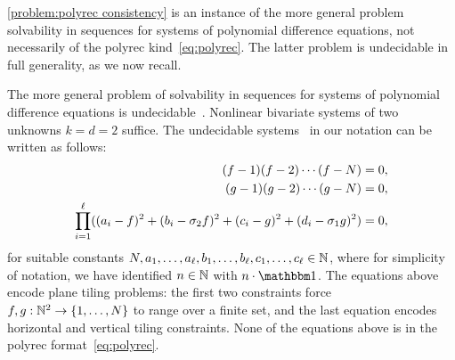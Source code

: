 %
\noindent
\cref{problem:polyrec consistency} is an instance of the more general problem
solvability in sequences for systems of polynomial difference equations,
not necessarily of the polyrec kind~\cref{eq:polyrec}.
%
The latter problem is undecidable in full generality, as we now recall.
%
\begin{remark}
    \label{rem:undecidability of polynomial difference equations}
    The more general problem of solvability in sequences
    for systems of polynomial difference equations
    is undecidable~\cite[Proposition 3.9]{PogudinScanlonWibmer:2020}.
    Nonlinear bivariate systems of two unknowns $k = d = 2$ suffice.
    The undecidable systems~\cite[Eq.~(5) on pg.~21]{PogudinScanlonWibmer:2020}
    in our notation can be written as follows:
    \begin{align*}
        (f - 1)(f - 2) \cdots (f - N) &= 0, \\
        (g - 1)(g - 2) \cdots (g - N) &= 0, \\
        \prod_{i = 1}^\ell ((a_i - f)^2 + (b_i - \sigma_{2} f)^2 + (c_i - g)^2 + (d_i - \sigma_{1} g)^2) &= 0,
    \end{align*}
    for suitable constants $N, a_1, \dots, a_\ell, b_1, \dots, b_\ell, c_1, \dots, c_\ell \in \mathbb N$,
    where for simplicity of notation, we have identified $n \in \mathbb N$ with $n \cdot \one$.
    The equations above encode plane tiling problems:
    the first two constraints force $f, g : \mathbb N^2 \to \left\{1, \dots, N\right\}$ to range over a finite set,
    and the last equation encodes horizontal and vertical tiling constraints.
    None of the equations above is in the polyrec format~\cref{eq:polyrec}.
\end{remark}

